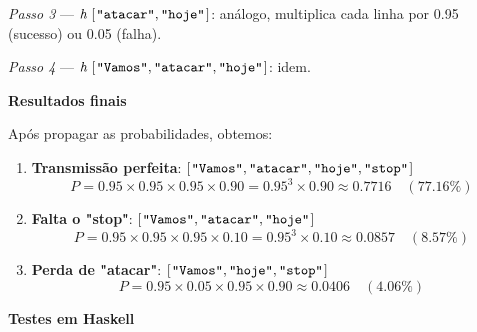 \documentclass[11pt, a4paper, fleqn]{article}
\newcommand{\Varid}[1]{\mathit{#1}}
\begin{document}
\emph{Passo 3} — \ensuremath{\Varid{h}\;[\mskip1.5mu \text{\ttfamily \char34 atacar\char34},\text{\ttfamily \char34 hoje\char34}\mskip1.5mu]}: análogo, multiplica cada linha por 0.95 (sucesso) ou 0.05 (falha).

\emph{Passo 4} — \ensuremath{\Varid{h}\;[\mskip1.5mu \text{\ttfamily \char34 Vamos\char34},\text{\ttfamily \char34 atacar\char34},\text{\ttfamily \char34 hoje\char34}\mskip1.5mu]}: idem.

\textbf{Resultados finais}

Após propagar as probabilidades, obtemos:

\begin{enumerate}
\item \textbf{Transmissão perfeita}: \ensuremath{[\mskip1.5mu \text{\ttfamily \char34 Vamos\char34},\text{\ttfamily \char34 atacar\char34},\text{\ttfamily \char34 hoje\char34},\text{\ttfamily \char34 stop\char34}\mskip1.5mu]}
\begin{displaymath}
P = 0.95 \times 0.95 \times 0.95 \times 0.90 = 0.95^3 \times 0.90 \approx 0.7716 \quad (77.16\%)
\end{displaymath}

\item \textbf{Falta o "stop"}: \ensuremath{[\mskip1.5mu \text{\ttfamily \char34 Vamos\char34},\text{\ttfamily \char34 atacar\char34},\text{\ttfamily \char34 hoje\char34}\mskip1.5mu]}
\begin{displaymath}
P = 0.95 \times 0.95 \times 0.95 \times 0.10 = 0.95^3 \times 0.10 \approx 0.0857 \quad (8.57\%)
\end{displaymath}

\item \textbf{Perda de "atacar"}: \ensuremath{[\mskip1.5mu \text{\ttfamily \char34 Vamos\char34},\text{\ttfamily \char34 hoje\char34},\text{\ttfamily \char34 stop\char34}\mskip1.5mu]}
\begin{displaymath}
P = 0.95 \times 0.05 \times 0.95 \times 0.90 \approx 0.0406 \quad (4.06\%)
\end{displaymath}
\end{enumerate}

\textbf{Testes em Haskell}
\end{document}

